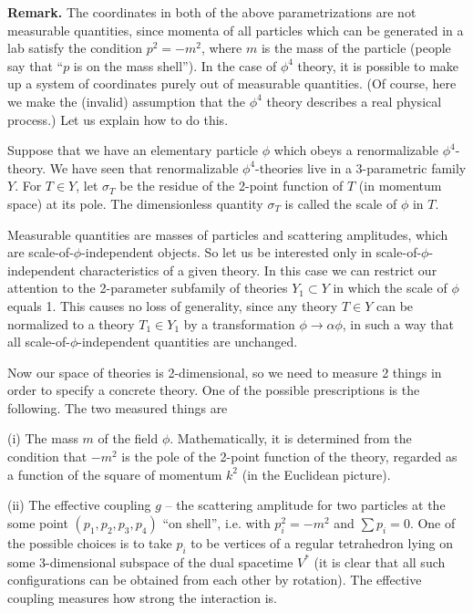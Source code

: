 {\bf Remark.} The coordinates in both of the above parametrizations 
are not measurable quantities, since 
momenta of all particles which can be generated in a lab 
satisfy the condition $p^2=-m^2$, where $m$ is the mass 
of the particle (people say that ``$p$ is on the mass shell''). 
In the case of $\phi^4$ theory, 
it is possible to make up a system of coordinates 
purely out of measurable quantities.   
(Of course, here we make the (invalid) assumption 
that the $\phi^4$ theory describes a real physical process.)
Let us explain how to do this. 

Suppose that we have an elementary particle $\phi$
which obeys a renormalizable $\phi^4$-theory. 
We have seen that renormalizable $\phi^4$-theories live in a 
3-parametric family $Y$. For $T\in Y$, let $\sigma_T$ 
be the residue of the 2-point function 
of $T$ (in momentum space) at its pole.
The dimensionless quantity $\sigma_T$ is called the scale of $\phi$
in $T$. 

Measurable quantities are masses of particles and scattering 
amplitudes, which are scale-of-$\phi$-independent objects. 
So let us be interested only in scale-of-$\phi$-independent 
characteristics of a given theory. 
In this case we can restrict our attention to the 2-parameter subfamily 
of theories $Y_1\subset Y$ in which 
the scale of $\phi$ equals 1. 
This causes no loss of generality, since any theory $T\in Y$ 
can be normalized to a theory $T_1\in Y_1$ by a transformation
$\phi\to \alpha \phi$, in such a way that all scale-of-$\phi$-independent 
quantities are unchanged. 

Now our space of theories is 2-dimensional,
 so we need to measure 2 things in order 
to specify a concrete theory. 
One of the possible prescriptions is the following.
The two measured things are

(i) The mass $m$ of the field $\phi$. Mathematically, 
it is determined from the condition that $-m^2$ is the pole 
of the 2-point function of the theory, regarded as a function
of the square of momentum $k^2$ (in the Euclidean picture). 

(ii) The effective coupling $g$ -- the scattering amplitude 
for two particles at the 
some point $(p_1,p_2,p_3,p_4)$ ``on shell'', i.e. 
with $p_i^2=-m^2$ and $\sum p_i=0$. 
One of the possible choices is to take 
$p_i$ to be vertices of a regular tetrahedron
lying on some 3-dimensional subspace of 
the dual spacetime $V^*$ (it is clear that all 
such configurations can be obtained from each other by rotation).
The effective coupling measures how strong the interaction is. 

